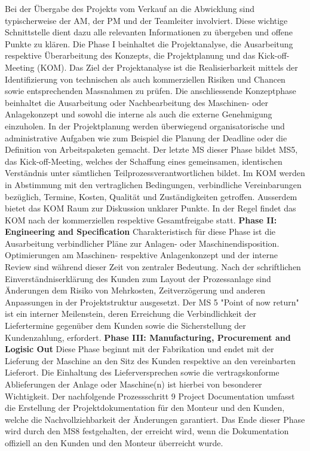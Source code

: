 Bei der Übergabe des Projekts vom Verkauf an die Abwicklung sind typischerweise der AM, der PM und der Teamleiter involviert. Diese wichtige Schnittstelle dient dazu alle relevanten Informationen zu übergeben und offene Punkte zu klären. Die Phase I beinhaltet die Projektanalyse, die Ausarbeitung respektive Überarbeitung des Konzepts, die Projektplanung und das Kick-off-Meeting (KOM). Das Ziel der Projektanalyse ist die Realisierbarkeit mittels der Identifizierung von technischen als auch kommerziellen Risiken und Chancen sowie entsprechenden Massnahmen zu prüfen. Die anschliessende Konzeptphase beinhaltet die Ausarbeitung oder Nachbearbeitung des Maschinen- oder Anlagekonzept und sowohl die interne als auch die externe Genehmigung einzuholen. In der Projektplanung werden überwiegend organisatorische und administrative Aufgaben wie zum Beispiel die Planung der Deadline oder die Definition von Arbeitspaketen gemacht. Der letzte MS dieser Phase bildet MS5, das Kick-off-Meeting, welches der Schaffung eines gemeinsamen, identischen Verständnis unter sämtlichen Teilprozessverantwortlichen bildet. Im KOM werden in Abstimmung mit den vertraglichen Bedingungen, verbindliche Vereinbarungen bezüglich, Termine, Kosten, Qualität und Zuständigkeiten getroffen. Ausserdem bietet das KOM Raum zur Diskussion unklarer Punkte. In der Regel findet das KOM nach der kommerziellen respektive Gesamtfreigabe statt.
\newline
\textbf{Phase II: Engineering and Specification}
\newline
Charakteristisch für diese Phase ist die Ausarbeitung verbindlicher Pläne zur Anlagen- oder Maschinendisposition. Optimierungen am Maschinen- respektive Anlagenkonzept und der interne Review sind während dieser Zeit von zentraler Bedeutung. Nach der schriftlichen Einverständniserklärung des Kunden zum Layout der Prozessanlage sind Änderungen dem Risiko von Mehrkosten, Zeitverzögerung und anderen Anpassungen in der Projektstruktur ausgesetzt. Der MS 5 "Point of now return" ist ein interner Meilenstein, deren Erreichung die Verbindlichkeit der Liefertermine gegenüber dem Kunden sowie die Sicherstellung der Kundenzahlung, erfordert. 
\newline
\textbf{Phase III: Manufacturing, Procurement and Logisic Out}
\newline
Diese Phase beginnt mit der Fabrikation und endet mit der Lieferung der Maschine an den Sitz des Kunden respektive an den vereinbarten Lieferort. Die Einhaltung des Lieferversprechen sowie die vertragskonforme Ablieferungen der Anlage oder Maschine(n) ist hierbei von besonderer Wichtigkeit. Der nachfolgende Prozessschritt 9 Project Documentation umfasst die Erstellung der Projektdokumentation für den Monteur und den Kunden, welche die Nachvollziehbarkeit der Änderungen garantiert. Das Ende dieser Phase wird durch den MS8 festgehalten, der erreicht wird, wenn die Dokumentation offiziell an den Kunden und den Monteur überreicht wurde. 
